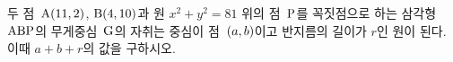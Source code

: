 두 점~$\mathrm{A}(11{,}\mkern3mu\mathopen{}2)$, $\mathrm{B}(4{,}\mkern3mu\mathopen{}10)$과 원 $x^2+y^2=81$ 위의 점~$\mathrm{P}$를 꼭짓점으로 하는 삼각형~$\mathrm{ABP}$의 무게중심~$\mathrm{G}$의 자취는 중심이 점~$(a{,}\mkern3mu\mathopen{}b)$이고 반지름의 길이가 $r$인 원이 된다. 이때 $a+b+r$의 값을 구하시오.
